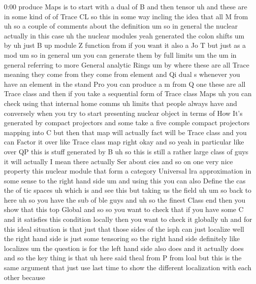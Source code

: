 \begin{unfinished}{0:00}
produce  Maps  is
to  start  with  a  dual  of  B  and  then
tensor
uh  and  these  are  in  some  kind  of  of
Trace
CL
so  this  in  some  way  incling  the  idea
that  all  M
from  uh  so  a  couple  of  comments  about
the
definition
um  so  in  general  the  nuclear  actually  in
this  case  uh  the  nuclear
modules  yeah  generated  the
colon
shifts  um
by  uh  just  B  up
module  Z  function
from  if  you  want  it  also  a  Jo  T  but  just
as  a
mod
um  so  in
general  um  you  can  generate  them  by  full
limits
um
the
um  in  general  referring  to  more  General
analytic  Rings  um  by  where  these  are  all
Trace  meaning  they  come  from  they  come
from  element  and  Qi  dual
s  whenever  you  have  an  element  in  the
stand  Pro  you  can  produce  a  m  from  Q  one
these  are  all  Trace  class  and  then  if
you  take  a  sequential  form  of  Trace
class  Maps  uh  you  can  check  using  that
internal  home  comms  uh  limits  that
people  always
have  and  conversely  when  you  try  to
start  presenting  nuclear  object  in  terms
of  How  It's  generated  by  compact
projectors  and  some  take  a  five  comple
compact  projectors  mapping  into  C  but
then  that  map  will  actually  fact  will  be
Trace  class  and  you  can  Factor  it  over
like  Trace  class
map
right
okay  and  so  yeah  in  particular  like  over
QP  this  is  stuff  generated  by
B  uh  so  this  is  still  a  rather  large
class
of  guys  it  will
actually  I  mean  there  actually  Ser  about
cies  and  so  on  one  very  nice  property
this  nuclear  module  that  form  a  category
Universal  lra  approximation  in  some
sense  to  the  right  hand  side  um  and
using  this  you  can  also  Define  the  cas
the  of  tic  spaces  uh  which  is  and  see
this  but  taking  us
the  field
uh  um  so  back  to  here  uh  so  you  have  the
sub  of  ble  guys  and  uh  so  the  finest
Class
end  then  you  show  that  this  top
Global  and
so  so  you  want  to  check  that
if  you  have  some  C  and  it  satisfies  this
condition  locally  then  you  want  to  check
it
globally  uh  and  for  this  ideal  situation
is  that  just  that  those  sides  of  the
isph  can  just  localize  well  the  right
hand  side  is  just  some  tensoring  so  the
right  hand  side  definitely  like
localizes
um  the  question  is  for  the  left  hand
side  also  does  and  it  actually  does  and
so  the  key  thing  is
that
uh  here  said  theal  from
P  from
loal  but  this  is  the  same  argument  that
just  use  last  time  to  show  the  different
localization  with  each  other  because

\end{unfinished}
